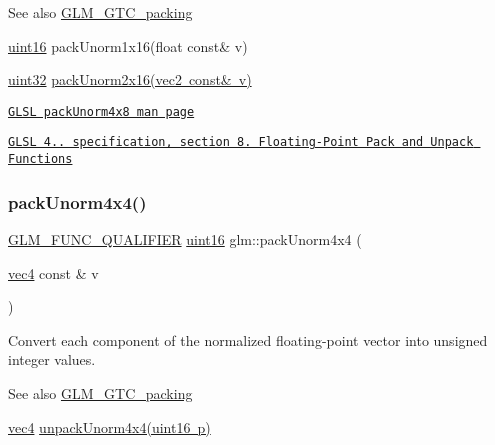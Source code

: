 \begin{DoxySeeAlso}{See also}
\mbox{\hyperlink{group__gtc__packing}{G\+L\+M\+\_\+\+G\+T\+C\+\_\+packing}} 

\mbox{\hyperlink{group__gtc__type__precision_gad8c2939e1fdd8e5828b31d95c52255d5}{uint16}} pack\+Unorm1x16(float const\& v) 

\mbox{\hyperlink{group__gtc__type__precision_ga202b6a53c105fcb7e531f9b443518451}{uint32}} \mbox{\hyperlink{group__core__func__packing_ga0e2d107039fe608a209497af867b85fb}{pack\+Unorm2x16(vec2 const\& v)}} 

\href{http://www.opengl.org/sdk/docs/manglsl/xhtml/packUnorm4x8.xml}{\tt G\+L\+SL pack\+Unorm4x8 man page} 

\href{http://www.opengl.org/registry/doc/GLSLangSpec.4.20.8.pdf}{\tt G\+L\+SL 4.. specification, section 8. Floating-\/\+Point Pack and Unpack Functions} 
\end{DoxySeeAlso}
\mbox{\label{group__gtc__packing_gad493c9f130e91dd8a4b360b05dcea573}} 
\subsubsection{\texorpdfstring{pack\+Unorm4x4()}{packUnorm4x4()}}
{\footnotesize\ttfamily \mbox{\hyperlink{setup_8hpp_a33fdea6f91c5f834105f7415e2a64407}{G\+L\+M\+\_\+\+F\+U\+N\+C\+\_\+\+Q\+U\+A\+L\+I\+F\+I\+ER}} \mbox{\hyperlink{group__gtc__type__precision_gad8c2939e1fdd8e5828b31d95c52255d5}{uint16}} glm\+::pack\+Unorm4x4 (\begin{DoxyParamCaption}\item[{\mbox{\hyperlink{group__core__types_ga5881b1b022d7fd1b7218f5916532dd02}{vec4}} const \&}]{v }\end{DoxyParamCaption})}

Convert each component of the normalized floating-\/point vector into unsigned integer values.

\begin{DoxySeeAlso}{See also}
\mbox{\hyperlink{group__gtc__packing}{G\+L\+M\+\_\+\+G\+T\+C\+\_\+packing}} 

\mbox{\hyperlink{group__core__types_ga5881b1b022d7fd1b7218f5916532dd02}{vec4}} \mbox{\hyperlink{group__gtc__packing_ga38a0a518d53e15a9481c31dc1e574a40}{unpack\+Unorm4x4(uint16 p)}} 
\end{DoxySeeAlso}
\mbox{\label{group__gtc__packing_ga8b9c7991eb021d95c778bf5c0b2f7824}} 
